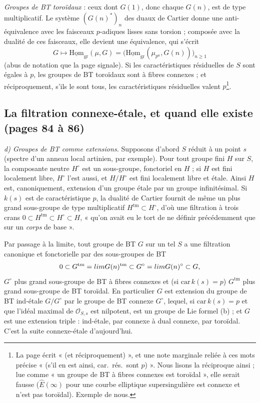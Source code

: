 \documentclass[11pt,a4paper]{article}
\begin{document}
\emph{Groupes de BT toroïdaux} : ceux dont $G(1)$, donc chaque $G(n)$, est
de type multiplicatif. Le système $(G(n)^{*})_n$ des duaux de Cartier
donne une anti-équivalence avec les faisceaux $p$-adiques lisses sans
torsion ; composée avec la dualité de ces faisceaux, elle devient une
équivalence, qui s'écrit
\[
G \longmapsto \underline{\mathrm{Hom}}_{\mathrm{gr}}(\mu, G)
= \bigl( \underline{\mathrm{Hom}}_{\mathrm{gr}}(\mu_{p^{n}}, G(n)) \bigr)_{n \geq 1}
\]
(abus de notation que la page signale). Si les caractéristiques
résiduelles de $S$ sont égales à $p$, les groupes de BT toroïdaux sont à
fibres connexes ; et réciproquement, s'ils le sont tous, les
caractéristiques résiduelles valent $p$\footnote{La page écrit « (et
réciproquement) », et une note marginale reliée à ces mots précise
« (s'il en est ainsi, car.\ rés.\ sont $p$) ». Nous lisons la réciproque
ainsi ; lue comme « un groupe de BT à fibres connexes est toroïdal », elle
serait fausse ($\widehat{E}(\infty)$ pour une courbe elliptique
supersingulière est connexe et n'est pas toroïdal). Exemple de nous.}.

\subsection*{La filtration connexe-étale, et quand elle existe (pages 84 à 86)}

\emph{d) Groupes de BT comme extensions.} Supposons d'abord $S$ réduit à
un point $s$ (spectre d'un anneau local artinien, par exemple). Pour tout
groupe fini $H$ sur $S$, la composante neutre $H^{\circ}$ est un
sous-groupe, fonctoriel en $H$ ; si $H$ est fini localement libre,
$H^{\circ}$ l'est aussi, et $H/H^{\circ}$ est fini localement libre et
étale. Ainsi $H$ est, canoniquement, extension d'un groupe étale par un
groupe infinitésimal. Si $k(s)$ est de caractéristique $p$, la dualité de
Cartier fournit de même un plus grand sous-groupe de type multiplicatif
$H^{\mathrm{tm}} \subset H^{\circ}$, d'où une filtration à trois crans
$0 \subset H^{\mathrm{tm}} \subset H^{\circ} \subset H$, « qu'on avait eu
le tort de ne définir précédemment que sur un \emph{corps} de base ».

Par passage à la limite, tout groupe de BT $G$ sur un tel $S$ a une
filtration canonique et fonctorielle par des sous-groupes de BT
\[
0 \subset G^{\mathrm{tm}} = \varinjlim G(n)^{\mathrm{tm}} \subset
G^{\circ} = \varinjlim G(n)^{\circ} \subset G,
\]
$G^{\circ}$ plus grand sous-groupe de BT à fibres connexes et (si
$\mathrm{car}\, k(s) = p$) $G^{\mathrm{tm}}$ plus grand sous-groupe de BT
toroïdal. En particulier $G$ est extension du groupe de BT ind-étale
$G/G^{\circ}$ par le groupe de BT connexe $G^{\circ}$, lequel, si
$\mathrm{car}\, k(s) = p$ et que l'idéal maximal de $\mathcal{O}_{S,s}$
est nilpotent, est un groupe de Lie formel (b) ; et $G$ est une extension
triple : ind-étale, par connexe à dual connexe, par toroïdal. C'est la
suite connexe-étale d'aujourd'hui.
\end{document}
